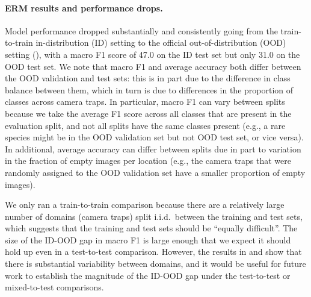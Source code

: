 \paragraph{ERM results and performance drops.}
Model performance dropped substantially and consistently going from the train-to-train in-distribution (ID) setting to the official out-of-distribution (OOD) setting (),
with a macro F1 score of 47.0 on the ID test set but only 31.0 on the OOD test set.
We note that macro F1 and average accuracy both differ between the OOD validation and test sets: this is in part due to the difference in class balance between them, which in turn is due to differences in the proportion of classes across camera traps.
In particular, macro F1 can vary between splits because we take the average F1 score across all classes that are present in the evaluation split, and not all splits have the same classes present (e.g., a rare species might be in the OOD validation set but not OOD test set, or vice versa). In additional, average accuracy can differ between splits due in part to variation in the fraction of empty images per location (e.g., the camera traps that were randomly assigned to the OOD validation set have a smaller proportion of empty images).

We only ran a train-to-train comparison because there are a relatively large number of domains (camera traps) split i.i.d.~between the training and test sets, which suggests that the training and test sets should be ``equally difficult''. The size of the ID-OOD gap in macro F1 is large enough that we expect it should hold up even in a test-to-test comparison.
However, the results in  and  show that there is substantial variability between domains, and it would be useful for future work to establish the magnitude of the ID-OOD gap under the test-to-test or mixed-to-test comparisons.

